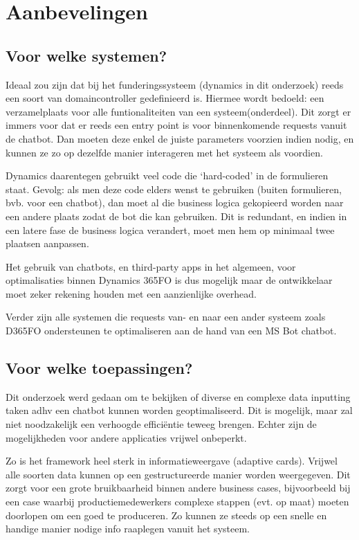 \section{Aanbevelingen}
\subsection{Voor welke systemen?}
Ideaal zou zijn dat bij het funderingssysteem (dynamics in dit onderzoek) reeds een soort van domaincontroller gedefinieerd is. Hiermee wordt bedoeld: een verzamelplaats voor alle  funtionaliteiten van een systeem(onderdeel). Dit zorgt er immers voor dat er reeds een entry point is voor binnenkomende requests vanuit de chatbot. Dan moeten deze enkel de juiste parameters voorzien indien nodig, en kunnen ze zo op dezelfde manier interageren met het systeem als voordien. 

Dynamics daarentegen gebruikt veel code die `hard-coded' in de formulieren staat. Gevolg: als men deze code elders wenst te gebruiken (buiten formulieren, bvb. voor een chatbot), dan moet al die business logica gekopieerd worden naar een andere plaats zodat de bot die kan gebruiken. Dit is redundant, en indien in een latere fase de business logica verandert, moet men hem op minimaal twee plaatsen aanpassen.

Het gebruik van chatbots, en third-party apps in het algemeen, voor optimalisaties binnen Dynamics 365FO is dus mogelijk maar de ontwikkelaar moet zeker rekening houden met een aanzienlijke overhead. 

Verder zijn alle systemen die requests van- en naar een ander systeem zoals D365FO ondersteunen te optimaliseren aan de hand van een MS Bot chatbot. 

\subsection{Voor welke toepassingen?}
Dit onderzoek werd gedaan om te bekijken of diverse en complexe data inputting taken adhv een chatbot kunnen worden geoptimaliseerd. Dit is mogelijk, maar zal niet noodzakelijk een verhoogde efficiëntie teweeg brengen. Echter zijn de mogelijkheden voor andere applicaties vrijwel onbeperkt. 

Zo is het framework heel sterk in informatieweergave (adaptive cards). Vrijwel alle soorten data kunnen op een gestructureerde manier worden weergegeven. Dit zorgt voor een grote bruikbaarheid binnen andere business cases, bijvoorbeeld bij een case waarbij productiemedewerkers complexe stappen (evt. op maat) moeten doorlopen om een goed te produceren. Zo kunnen ze steeds op een snelle en handige manier nodige info raaplegen vanuit het systeem. 

